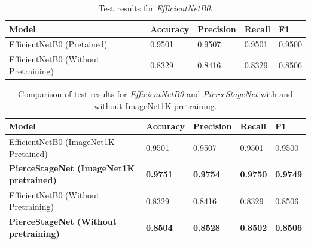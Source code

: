 \documentclass[conference]{IEEEtran}
\begin{document}
\begin{table}[H]
	\caption{Test results for \textit{EfficientNetB0}.}
	\centering
	\begin{tabular}{m{} m{} m{} m{} m{}}
		\toprule
		\textbf{Model} &\textbf{Accuracy} & \textbf{Precision} & \textbf{Recall} & \textbf{F1} \\
		\midrule
		EfficientNetB0 (Pretained)         & 0.9501            & 0.9507           & 0.9501          & 0.9500    \\
		EfficientNetB0 (Without Pretraining)& 0.8329           & 0.8416             & 0.8329          & 0.8506    \\
		\bottomrule
	\end{tabular}
	\label{tab:eb_metrics}
\end{table}

\begin{table}[t]
	\caption{Comparison of test results for \textit{EfficientNetB0} and \textit{PierceStageNet} with and without ImageNet1K pretraining.}
	\centering
	\begin{tabular}{m{} m{} m{} m{} m{}}
		\toprule
		\textbf{Model} & \textbf{Accuracy} & \textbf{Precision} & \textbf{Recall} & \textbf{F1} \\
		\midrule
		EfficientNetB0 (ImageNet1K Pretained)         & 0.9501            & 0.9507           & 0.9501          & 0.9500    \\
		\textbf{PierceStageNet (ImageNet1K pretrained)} & \textbf{0.9751} & \textbf{0.9754} & \textbf{0.9750} & \textbf{0.9749} \\
		EfficientNetB0 (Without Pretraining)& 0.8329           & 0.8416             & 0.8329          & 0.8506    \\
		\textbf{PierceStageNet (Without pretraining)} & \textbf{0.8504} & \textbf{0.8528} & \textbf{0.8502} & \textbf{0.8506} \\
		\bottomrule
	\end{tabular}
	\label{tab:comparison_all_models}
\end{table}
\end{document}
